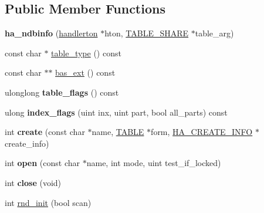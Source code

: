 \subsection*{Public Member Functions}
\begin{DoxyCompactItemize}
\item 
\mbox{\label{classha__ndbinfo_a775853f9437f8637cb33d1c989ab1c08}} 
{\bfseries ha\+\_\+ndbinfo} (\mbox{\hyperlink{structhandlerton}{handlerton}} $\ast$hton, \mbox{\hyperlink{structTABLE__SHARE}{T\+A\+B\+L\+E\+\_\+\+S\+H\+A\+RE}} $\ast$table\+\_\+arg)
\item 
const char $\ast$ \mbox{\hyperlink{classha__ndbinfo_a4f8caa0e516e62ccce4a5f2a52590548}{table\+\_\+type}} () const
\item 
const char $\ast$$\ast$ \mbox{\hyperlink{classha__ndbinfo_ae7153997d64cb4e94ce23ecfb92714fb}{bas\+\_\+ext}} () const
\item 
\mbox{\label{classha__ndbinfo_a9290b4ae5594d9d58d4a66b84561764e}} 
ulonglong {\bfseries table\+\_\+flags} () const
\item 
\mbox{\label{classha__ndbinfo_ab7a43994546827a77729bc50be4a1570}} 
ulong {\bfseries index\+\_\+flags} (uint inx, uint part, bool all\+\_\+parts) const
\item 
\mbox{\label{classha__ndbinfo_aa7aaa6f7dbdb5873e9c9bf95d0c06a01}} 
int {\bfseries create} (const char $\ast$name, \mbox{\hyperlink{structTABLE}{T\+A\+B\+LE}} $\ast$form, \mbox{\hyperlink{structst__ha__create__information}{H\+A\+\_\+\+C\+R\+E\+A\+T\+E\+\_\+\+I\+N\+FO}} $\ast$create\+\_\+info)
\item 
\mbox{\label{classha__ndbinfo_af1f092257e1ff9e3113d751e98039a3a}} 
int {\bfseries open} (const char $\ast$name, int mode, uint test\+\_\+if\+\_\+locked)
\item 
\mbox{\label{classha__ndbinfo_ad2c8c0df6ec148099b4749d7fca2fb09}} 
int {\bfseries close} (void)
\item 
int \mbox{\hyperlink{classha__ndbinfo_a0157ed0545e9748cccbd9b58a7178529}{rnd\+\_\+init}} (bool scan)
\item 
\mbox{\label{classha__ndbinfo_aaa955fbfc88fdf4434a70dc528be3e80}} 
$$
\end{DoxyCompactItemize}
